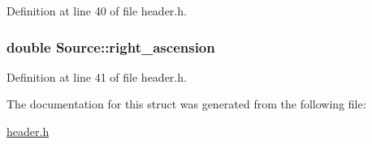Definition at line 40 of file header.h.\hypertarget{structSource_a3378987660510b2ab4f02db5aa81791e}{
\subsubsection[{right\_\-ascension}]{\setlength{\rightskip}{0pt plus 5cm}double {\bf Source::right\_\-ascension}}}
\label{structSource_a3378987660510b2ab4f02db5aa81791e}


Definition at line 41 of file header.h.

The documentation for this struct was generated from the following file:\begin{DoxyCompactItemize}
\item 
\hyperlink{header_8h}{header.h}\end{DoxyCompactItemize}
